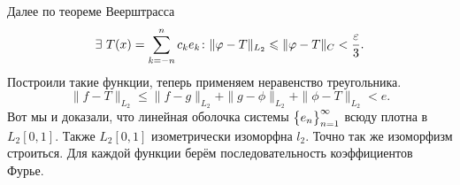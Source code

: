 Далее по теореме Веерштрасса
\[
	\exists\ T(x) = \RY k{-n}nc_ke_k\colon \|\phi - T\|_{L_2}\le \|\phi - T\|_C<\frac\e3.
\]
Построили такие функции, теперь применяем неравенство треугольника.
\[
	\|f-T\|_{L_2}\le \|f-g\|_{L_2} + \|g-\phi\|_{L_2} + \|\phi- T\|_{L_2}<e.
\]
Вот мы и доказали, что линейная оболочка системы $\big\{{e}_{n}\big\}_{n=1}^\infty$ всюду плотна в $L_2[0,1]$. Также $L_2[0,1]$ изометрически изоморфна $l_2$. Точно так же изоморфизм строиться. Для каждой функции берём последовательность коэффициентов Фурье.
